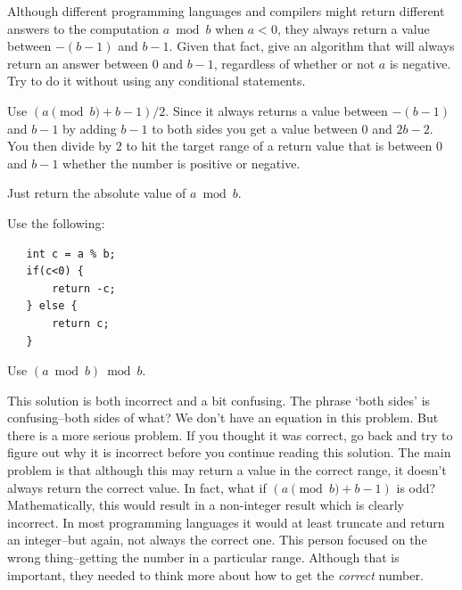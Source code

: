 \begin{eval}\label{eval:negmod}
Although different programming languages and compilers might 
return different answers to the computation $a \bmod b$ when $a<0$, they always
return a value between $-(b-1)$ and $b-1$.  Given that fact, give an algorithm that
will always return an answer between $0$ and $b-1$, regardless of whether or not $a$ is negative.
Try to do it without using any conditional statements.

\begin{ssolenum}
\item
Use $(a\pmod{b} + b-1)/2$.  
Since it always returns a value between $-(b-1)$ and $b-1$ by adding $b-1$ to both sides
you get a value between $0$ and $2b-2$.  You then divide by $2$ to hit the target range of a return value that
is between $0$ and $b-1$ whether the number is positive or negative.\\
\evallinethree
\item
 Just return the absolute value of $a \bmod b$.\\
\evallinethree
\newpage
\item
Use the following:
\begin{lstlisting}
   int c = a % b;
   if(c<0) {
       return -c;
   } else {
       return c;
   }
   \end{lstlisting}
\evallinethree
\item
Use $(a\bmod b)\bmod b$.\\
\evallinethree
\end{ssolenum}
\begin{answer}
\begin{solevalenum}
\item
This solution is both incorrect and a bit confusing. 
The phrase `both sides' is confusing--both sides of what?
We don't have an equation in this problem.  
But there is a more serious problem. 
If you thought it was correct, go back and try to figure out why it is incorrect before you
continue reading this solution.
The main problem is that although this may return 
a value in the correct range, it doesn't always return the correct value.  In fact, what if
$(a\pmod{b} + b-1)$ is odd?  Mathematically, this would result in a non-integer result which is
clearly incorrect.  In most programming languages it would at least truncate and
return an integer--but again, not always the correct one.
This person focused on the wrong thing--getting the number in a particular range.  Although that
is important, they needed to think more about how to get the {\em correct} number.

\end{solevalenum}
\end{answer}
\end{eval}

